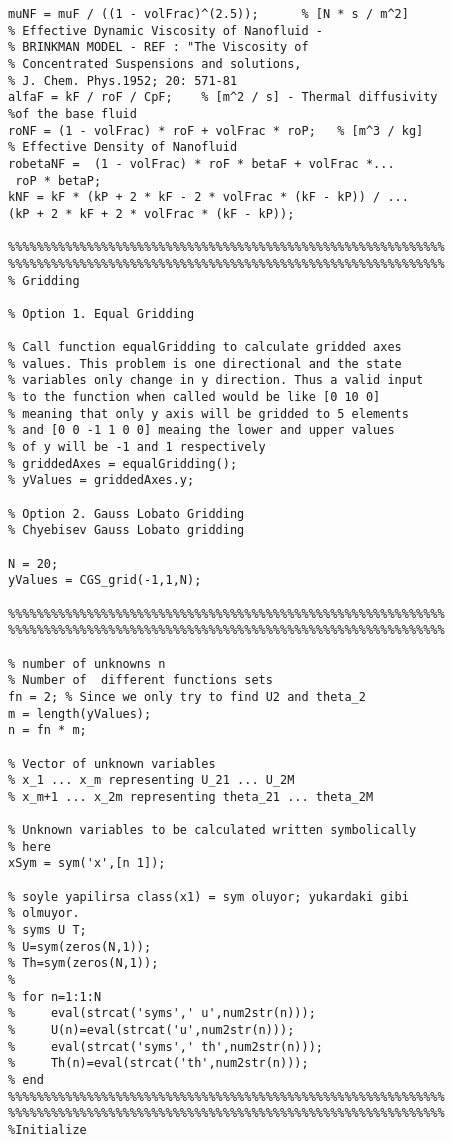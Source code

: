 \begin{lstlisting}
muNF = muF / ((1 - volFrac)^(2.5));      % [N * s / m^2] 
% Effective Dynamic Viscosity of Nanofluid - 
% BRINKMAN MODEL - REF : "The Viscosity of 
% Concentrated Suspensions and solutions, 
% J. Chem. Phys.1952; 20: 571-81
alfaF = kF / roF / CpF;    % [m^2 / s] - Thermal diffusivity 
%of the base fluid 
roNF = (1 - volFrac) * roF + volFrac * roP;   % [m^3 / kg]
% Effective Density of Nanofluid
robetaNF =  (1 - volFrac) * roF * betaF + volFrac *...
 roP * betaP;  
kNF = kF * (kP + 2 * kF - 2 * volFrac * (kF - kP)) / ...
(kP + 2 * kF + 2 * volFrac * (kF - kP));

%%%%%%%%%%%%%%%%%%%%%%%%%%%%%%%%%%%%%%%%%%%%%%%%%%%%%%%%%%%%%
%%%%%%%%%%%%%%%%%%%%%%%%%%%%%%%%%%%%%%%%%%%%%%%%%%%%%%%%%%%%%
% Gridding 

% Option 1. Equal Gridding

% Call function equalGridding to calculate gridded axes 
% values. This problem is one directional and the state 
% variables only change in y direction. Thus a valid input 
% to the function when called would be like [0 10 0] 
% meaning that only y axis will be gridded to 5 elements 
% and [0 0 -1 1 0 0] meaing the lower and upper values 
% of y will be -1 and 1 respectively
% griddedAxes = equalGridding();
% yValues = griddedAxes.y;

% Option 2. Gauss Lobato Gridding
% Chyebisev Gauss Lobato gridding

N = 20;
yValues = CGS_grid(-1,1,N);

%%%%%%%%%%%%%%%%%%%%%%%%%%%%%%%%%%%%%%%%%%%%%%%%%%%%%%%%%%%%%
%%%%%%%%%%%%%%%%%%%%%%%%%%%%%%%%%%%%%%%%%%%%%%%%%%%%%%%%%%%%%

% number of unknowns n
% Number of  different functions sets 
fn = 2; % Since we only try to find U2 and theta_2
m = length(yValues);
n = fn * m;

% Vector of unknown variables 
% x_1 ... x_m representing U_21 ... U_2M
% x_m+1 ... x_2m representing theta_21 ... theta_2M

% Unknown variables to be calculated written symbolically 
% here
xSym = sym('x',[n 1]);

% soyle yapilirsa class(x1) = sym oluyor; yukardaki gibi 
% olmuyor.
% syms U T;
% U=sym(zeros(N,1));
% Th=sym(zeros(N,1));
% 
% for n=1:1:N
%     eval(strcat('syms',' u',num2str(n)));
%     U(n)=eval(strcat('u',num2str(n)));
%     eval(strcat('syms',' th',num2str(n)));
%     Th(n)=eval(strcat('th',num2str(n)));
% end
%%%%%%%%%%%%%%%%%%%%%%%%%%%%%%%%%%%%%%%%%%%%%%%%%%%%%%%%%%%%%
%%%%%%%%%%%%%%%%%%%%%%%%%%%%%%%%%%%%%%%%%%%%%%%%%%%%%%%%%%%%%
%Initialize


\end{lstlisting}
